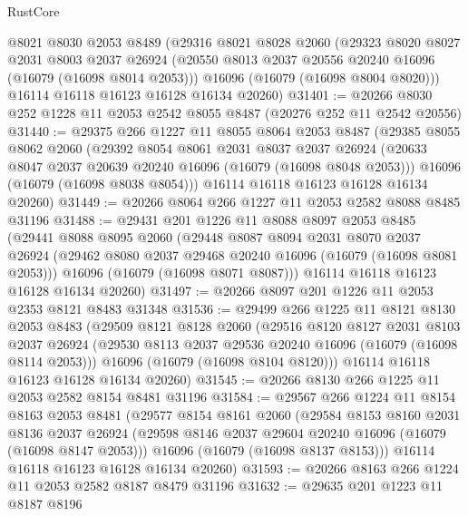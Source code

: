 \begin{lexlean}{RustCore}
\begin{coremodule}
    @8021
    @8030
    @2053
    @8489
    (@29316
      @8021
      @8028
      @2060
      (@29323
        @8020
        @8027
        @2031
        @8003
        @2037
        @26924
        (@20550 @8013 @2037 @20556 @20240 @16096 (@16079 (@16098 @8014 @2053)))
        @16096
        (@16079 (@16098 @8004 @8020)))
      @16114
      @16118
      @16123
      @16128
      @16134
      @20260)
@31401 := @20266 @8030 @252 @1228 @11 @2053 @2542 @8055 @8487 (@20276 @252 @11 @2542 @20556)
@31440 := @29375
    @266
    @1227
    @11
    @8055
    @8064
    @2053
    @8487
    (@29385
      @8055
      @8062
      @2060
      (@29392
        @8054
        @8061
        @2031
        @8037
        @2037
        @26924
        (@20633 @8047 @2037 @20639 @20240 @16096 (@16079 (@16098 @8048 @2053)))
        @16096
        (@16079 (@16098 @8038 @8054)))
      @16114
      @16118
      @16123
      @16128
      @16134
      @20260)
@31449 := @20266 @8064 @266 @1227 @11 @2053 @2582 @8088 @8485 @31196
@31488 := @29431
    @201
    @1226
    @11
    @8088
    @8097
    @2053
    @8485
    (@29441
      @8088
      @8095
      @2060
      (@29448
        @8087
        @8094
        @2031
        @8070
        @2037
        @26924
        (@29462 @8080 @2037 @29468 @20240 @16096 (@16079 (@16098 @8081 @2053)))
        @16096
        (@16079 (@16098 @8071 @8087)))
      @16114
      @16118
      @16123
      @16128
      @16134
      @20260)
@31497 := @20266 @8097 @201 @1226 @11 @2053 @2353 @8121 @8483 @31348
@31536 := @29499
    @266
    @1225
    @11
    @8121
    @8130
    @2053
    @8483
    (@29509
      @8121
      @8128
      @2060
      (@29516
        @8120
        @8127
        @2031
        @8103
        @2037
        @26924
        (@29530 @8113 @2037 @29536 @20240 @16096 (@16079 (@16098 @8114 @2053)))
        @16096
        (@16079 (@16098 @8104 @8120)))
      @16114
      @16118
      @16123
      @16128
      @16134
      @20260)
@31545 := @20266 @8130 @266 @1225 @11 @2053 @2582 @8154 @8481 @31196
@31584 := @29567
    @266
    @1224
    @11
    @8154
    @8163
    @2053
    @8481
    (@29577
      @8154
      @8161
      @2060
      (@29584
        @8153
        @8160
        @2031
        @8136
        @2037
        @26924
        (@29598 @8146 @2037 @29604 @20240 @16096 (@16079 (@16098 @8147 @2053)))
        @16096
        (@16079 (@16098 @8137 @8153)))
      @16114
      @16118
      @16123
      @16128
      @16134
      @20260)
@31593 := @20266 @8163 @266 @1224 @11 @2053 @2582 @8187 @8479 @31196
@31632 := @29635
    @201
    @1223
    @11
    @8187
    @8196

\end{coremodule}
\end{lexlean}
